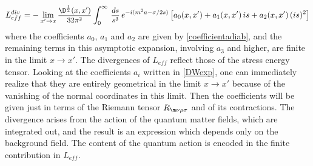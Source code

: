 \documentclass[a4paper,11pt,openright,twoside]{book}
\let\n=\nu      \let\x=\xi     \let\p=\pi      \let\r=\rho
\let\s=\sigma  \let\t=\tau     \let\u=\upsilon \let\f=\phi
\newcommand{\sdfrac}[2]{\mbox{\small$\displaystyle\frac{#1}{#2}$}}
\numberwithin{equation}{section}
\begin{document}
{{{	\begin{equation}
		L_{eff}^{div}=-\lim_{x'\to x}\sdfrac{\D^{\frac{1}{2}}(x,x')}{32\pi^2}\int_0^\infty\,\sdfrac{ds}{s^3}\,e^{-i(m^2a-\s/2 s)}\left[a_0(x,x')+a_1(x,x')\,is+a_2(x,x')\,(is)^2\right]\label{DWexp}
	\end{equation}
	where the coefficients $a_0$, $a_1$ and $a_2$ are given by \eqref{coefficientadiab}, and the remaining terms in this asymptotic expansion, involving $a_3$ and higher, are finite in the limit $x\to x'$. The divergences of $L_{eff}$ reflect those of the stress energy tensor. Looking at the coefficients $a_i$ written in \eqref{DWexp}, one can immediately realize that they are entirely geometrical in the limit $x\to x'$ because of the vanishing of the normal coordinates in this limit. Then the coefficients will be given just in terms of the Riemann tensor $R_{\m\n\r\s}$ and of its contractions. The divergence arises from the action of the quantum matter fields, which are integrated out, and the result is an expression which depends only on the background field. The content of the quantum action is encoded in the finite contribution in $L_{eff}$. 
	
}}}
\end{document}
